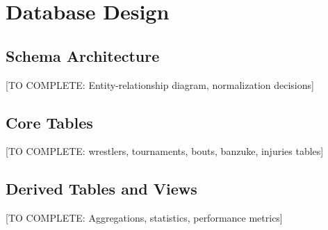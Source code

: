 \section{Database Design}

\subsection{Schema Architecture}

[TO COMPLETE: Entity-relationship diagram, normalization decisions]

\subsection{Core Tables}

[TO COMPLETE: wrestlers, tournaments, bouts, banzuke, injuries tables]

\subsection{Derived Tables and Views}

[TO COMPLETE: Aggregations, statistics, performance metrics]